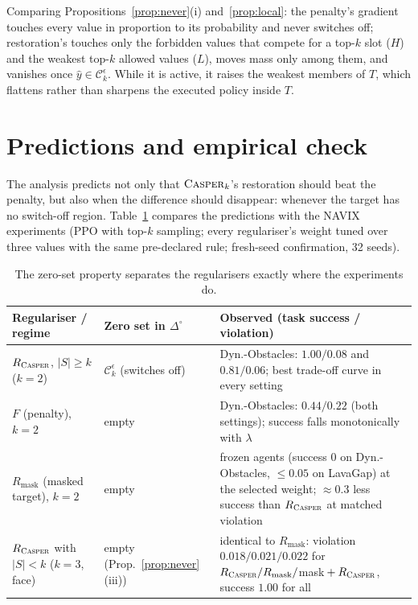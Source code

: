 \documentclass[11pt]{article}
\providecommand{\casper}{\textnormal{\textsc{Casper}}}
\newcommand{\yh}{\hat y}
\newcommand{\1}{\mathbf 1}
\newcommand{\Ck}{\mathcal C_k^{\epsilon}}
\newcommand{\Rc}{R_{\casper}}
\newcommand{\Rm}{R_{\mathrm{mask}}}
\theoremstyle{definition}
\theoremstyle{remark}
\begin{document}
Comparing Propositions~\ref{prop:never}(i) and~\ref{prop:local}: the penalty's gradient touches every
value in proportion to its probability and never switches off; restoration's touches only the
forbidden values that compete for a top-$k$ slot ($H$) and the weakest top-$k$ allowed values ($L$),
moves mass only among them, and vanishes once $\yh\in\Ck$. While it is active, it raises the weakest
members of $T$, which flattens rather than sharpens the executed policy inside $T$.

\section{Predictions and empirical check}

The analysis predicts not only that $\casper_k$'s restoration should beat the penalty, but also when
the difference should disappear: whenever the target has no switch-off region.
Table~\ref{tab:check} compares the predictions with the NAVIX experiments (PPO with top-$k$ sampling;
every regulariser's weight tuned over three values with the same pre-declared rule; fresh-seed
confirmation, 32 seeds).

\begin{table}[h]
\centering
\small
\begin{tabular}{@{}>{\raggedright\arraybackslash}p{4.4cm}>{\raggedright\arraybackslash}p{3.6cm}>{\raggedright\arraybackslash}p{6.3cm}@{}}
\toprule
Regulariser / regime & Zero set in $\Delta^\circ$ & Observed (task success / violation)\\
\midrule
$\Rc$, $|S|\ge k$ ($k=2$) & $\Ck$ (switches off) &
Dyn.-Obstacles: $1.00/0.08$ and $0.81/0.06$; best trade-off curve in every setting\\
$F$ (penalty), $k=2$ & empty & Dyn.-Obstacles: $0.44/0.22$ (both settings); success falls
monotonically with $\lambda$\\
$\Rm$ (masked target), $k=2$ & empty & frozen agents (success $0$ on Dyn.-Obstacles, $\le0.05$ on
LavaGap) at the selected weight; $\approx0.3$ less success than $\Rc$ at matched violation\\
$\Rc$ with $|S|<k$ ($k=3$, face) & empty (Prop.~\ref{prop:never}(iii)) & identical to $\Rm$:
violation $0.018/0.021/0.022$ for $\Rc/\Rm/$mask${}+\Rc$, success $1.00$ for all\\
\bottomrule
\end{tabular}
\caption{The zero-set property separates the regularisers exactly where the experiments do.}
\label{tab:check}
\end{table}
\end{document}
